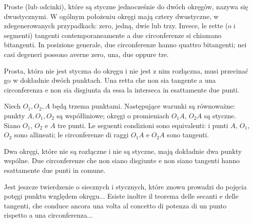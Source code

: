 
Proste (lub odcinki), które są styczne jednocześnie do dwóch okręgów, nazywa się dwustycznymi. %
W ogólnym położeniu okręgi mają cztery dwustyczne, w zdegenerowanych przypadkach: zero, jedną, dwie lub trzy. %
Invece, le rette (o i segmenti) tangenti contemporaneamente a due circonferenze si chiamano bitangenti. %
In posizione generale, due circonferenze hanno quattro bitangenti; nei casi degeneri possono averne zero, una, due oppure tre. %

\begin{corollary}
    Prosta, która nie jest styczna do okręgu i nie jest z nim rozłączna, musi przecinać go w dokładnie dwóch punktach. %
    Una retta che non sia tangente a una circonferenza e non sia disgiunta da essa la interseca in esattamente due punti. %
\end{corollary} %

\begin{proposition}
    Niech $O_1, O_2, A$ będą trzema punktami. %
    Następujące warunki są równoważne: punkty $A, O_1, O_2$ są współliniowe; okręgi o promieniach $O_1A$, $O_2A$ są styczne. %
    Siano $O_1$, $O_2$ e $A$ tre punti. %
    Le seguenti condizioni sono equivalenti: i punti $A$, $O_1$, $O_2$ sono allineati; le circonferenze di raggi $O_1A$ e $O_2A$ sono tangenti. %
\end{proposition} %

\begin{corollary}
    Dwa okręgi, które nie są rozłączne i nie są styczne, mają dokładnie dwa punkty wspólne. %
    Due circonferenze che non siano disgiunte e non siano tangenti hanno esattamente due punti in comune. %
\end{corollary} %

Jest jeszcze twierdzenie o siecznych i stycznych, które znowu prowadzi do pojęcia potęgi punktu względem okręgu... %
Esiste inoltre il teorema delle secanti e delle tangenti, che conduce ancora una volta al concetto di potenza di un punto rispetto a una circonferenza... %

